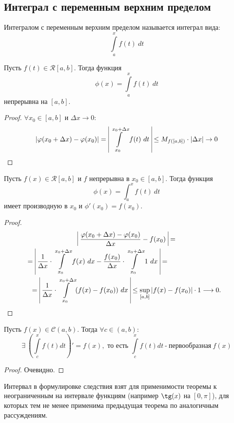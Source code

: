 \subsection{Интеграл с переменным верхним пределом}
\begin{definition}
    Интегралом с переменным верхним пределом называется интеграл вида:
    \[\int\limits_{a}^{x} f(t)\ dt\]
\end{definition} 
\begin{theorem}
    Пусть $f(t)\in \mathcal{R}[a, b]$. Тогда функция
    \[\phi(x) = \int\limits_{a}^{x} f(t)\ dt\]
    непрерывна на $[a, b]$.
\end{theorem}
\begin{proof} 
    $\forall x_0\in [a,b]$ и $\Delta x\to 0:$
    \[|\phi(x_0 + \Delta x) - \phi(x_0)| =\ \vline\int\limits_{x_0}^{x_0 + \Delta x} f(t)\ dt\ \vline \leq M_{f([a, b])}\cdot |\Delta x| \rightarrow 0\]
\end{proof}
\begin{theorem}
    Пусть $f(x)\in \mathcal{R}[a, b]$ и $f$ непрерывна в $x_0 \in [a, b]$. Тогда функция
    \[\phi(x) = \int_{a}^{x} f(t)\ dt\]
    имеет производную в $x_0$ и $\phi'(x_0) = f(x_0)$.
\end{theorem}
\begin{proof}
    \begin{multline*}
        \vline\ \frac{\phi(x_0 + \Delta x) - \phi(x_0)}{\Delta x} - f(x_0)\ \vline =\\=\ \vline\frac{1}{\Delta x}\cdot \int\limits_{x_0}^{x_0 + \Delta x} f(x)\ dx - \frac{f(x_0)}{\Delta x} \cdot \int\limits_{x_0}^{x_0 + \Delta x} 1\ dx\ \vline =\tab[3cm]\\=\ \vline\frac{1}{\Delta x}\cdot \int\limits_{x_0}^{x_0 + \Delta x} (f(x) - f(x_0))\ dx\ \vline \leq \sup \limits_{[a, b]}|f(x) - f(x_0)|\cdot 1 \longrightarrow 0.
    \end{multline*}
\end{proof}
\begin{consequense}
    Пусть $f(x) \in \mathcal{C}(a, b)$. Тогда $\forall c \in (a, b)$:
    \[\exists \ \left(\int\limits_{c}^{x} f(t)dt\right)' = f(x), \text{ то есть } \int\limits_{c}^{x} f(t)dt\ \text{-}\ \text{первообразная} \ f(x)\]
\end{consequense}
\begin{proof}
    Очевидно.
\end{proof}
\begin{comm}
    Интервал в формулировке следствия взят для применимости теоремы к неограниченным на интервале функциям (например $\tg(x)$ на $[0, \pi]$), для которых тем не менее применима предыдущая теорема по аналогичным рассуждениям.
\end{comm}
